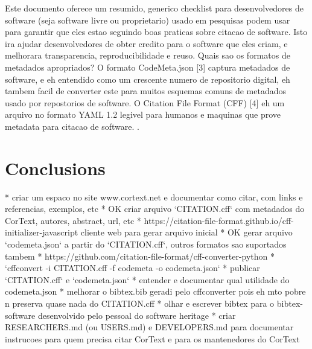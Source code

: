\documentclass{article}
\begin{document}
Este documento oferece um resumido, generico checklist para desenvolvedores de software
(seja software livre ou proprietario) usado em pesquisas podem usar para garantir que eles
estao seguindo boas praticas sobre citacao de software. Isto ira ajudar desenvolvedores de
obter credito para o software que eles criam, e melhorara transparencia, reproducibilidade
e reuso.
Quais sao os formatos de metadados apropriados?
O formato CodeMeta.json [3]  captura metadados de software, e eh entendido como um crescente
numero de repositorio digital, eh tambem facil de converter este para muitos esquemas
comuns de metadados usado por repostorios de software.
O Citation File Format (CFF) [4] eh um arquivo no formato YAML 1.2 legivel para humanos e
maquinas que prove metadata para citacao de software.
\cite{chue_hong_software_2019}.

\section{Conclusions}

* criar um espaco no site www.cortext.net e documentar como citar, com links e referencias, exemplos, etc
* OK criar arquivo `CITATION.cff` com metadados do CorText, autores, abstract, url, etc
  * https://citation-file-format.github.io/cff-initializer-javascript cliente web para gerar arquivo inicial
* OK gerar arquivo `codemeta.json` a partir do `CITATION.cff`, outros formatos sao suportados tambem
  * https://github.com/citation-file-format/cff-converter-python
  * `cffconvert -i CITATION.cff -f codemeta -o codemeta.json`
* publicar `CITATION.cff` e `codemeta.json`
* entender e documentar qual utilidade do codemeta.json
* melhorar o bibtex.bib geradi pelo cffconverter pois eh mto pobre n preserva quase nada do CITATION.cff
* olhar e escrever bibtex para o bibtex-software desenvolvido pelo pessoal do software heritage
* criar RESEARCHERS.md (ou USERS.md) e DEVELOPERS.md para documentar instrucoes para quem precisa citar CorText e para os mantenedores do CorText



\end{document}
